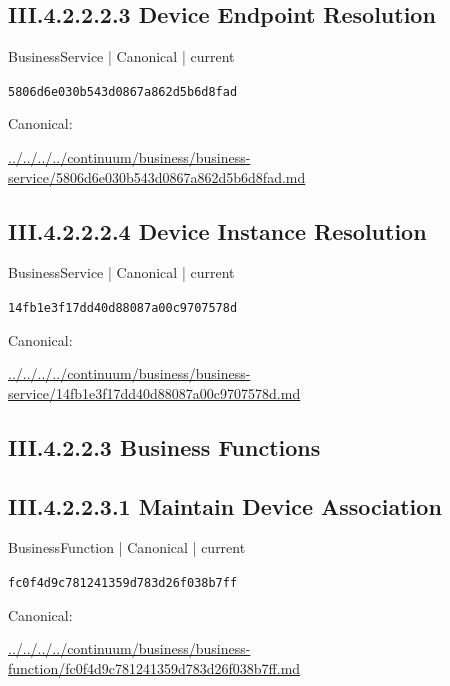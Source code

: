 \documentclass[10pt,a4paper]{article}
\begin{document}
\subsection*{III.4.2.2.2.3 Device Endpoint Resolution}
\label{element-5806d6e030b543d0867a862d5b6d8fad}
{\small BusinessService | Canonical | current}\par
\texttt{5806d6e030b543d0867a862d5b6d8fad}\par
Canonical: \par
{\footnotesize\url{../../../../continuum/business/business-service/5806d6e030b543d0867a862d5b6d8fad.md}}\par
\subsection*{III.4.2.2.2.4 Device Instance Resolution}
\label{element-14fb1e3f17dd40d88087a00c9707578d}
{\small BusinessService | Canonical | current}\par
\texttt{14fb1e3f17dd40d88087a00c9707578d}\par
Canonical: \par
{\footnotesize\url{../../../../continuum/business/business-service/14fb1e3f17dd40d88087a00c9707578d.md}}\par
\subsection*{III.4.2.2.3 Business Functions}
\subsection*{III.4.2.2.3.1 Maintain Device Association}
\label{element-fc0f4d9c781241359d783d26f038b7ff}
{\small BusinessFunction | Canonical | current}\par
\texttt{fc0f4d9c781241359d783d26f038b7ff}\par
Canonical: \par
{\footnotesize\url{../../../../continuum/business/business-function/fc0f4d9c781241359d783d26f038b7ff.md}}\par
\end{document}
